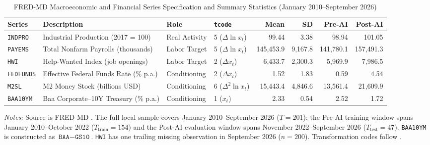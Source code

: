 \begin{table}[htbp]
\centering
\begin{threeparttable}
\caption{FRED-MD Macroeconomic and Financial Series Specification and Summary Statistics (January 2010--September 2026)}
\label{tab:data_summary}
\small
\begin{tabular}{@{}llllrrrr@{}}
\toprule
Series & Description & Role & \texttt{tcode} & Mean & SD & Pre-AI & Post-AI \\
\midrule
\texttt{INDPRO}   & Industrial Production (2017 = 100)       & Real Activity & 5 ($\Delta \ln x_t$)   & 99.44      & 3.38     & 98.94      & 101.05 \\
\texttt{PAYEMS}   & Total Nonfarm Payrolls (thousands)       & Labor Target  & 5 ($\Delta \ln x_t$)   & 145,453.9  & 9,167.8  & 141,780.1  & 157,491.3 \\
\texttt{HWI}      & Help-Wanted Index (job openings)         & Labor Target  & 2 ($\Delta x_t$)       & 6,433.7    & 2,300.3  & 5,969.9    & 7,986.5 \\
\texttt{FEDFUNDS} & Effective Federal Funds Rate (\% p.a.)   & Conditioning  & 2 ($\Delta x_t$)       & 1.52       & 1.83     & 0.59       & 4.54 \\
\texttt{M2SL}     & M2 Money Stock (billions USD)            & Conditioning  & 6 ($\Delta^2 \ln x_t$) & 15,443.4   & 4,846.6  & 13,561.4   & 21,609.9 \\
\texttt{BAA10YM}  & Baa Corporate--10Y Treasury (\% p.a.)    & Conditioning  & 1 ($x_t$)              & 2.33       & 0.54     & 2.52       & 1.72 \\
\bottomrule
\end{tabular}
\begin{tablenotes}[flushleft]
\footnotesize
\item \textit{Notes:} Source is FRED-MD \citep{mccracken2016fredmd}. The full local sample covers January 2010--September 2026 ($T = 201$); the Pre-AI training window spans January 2010--October 2022 ($T_{\text{train}} = 154$) and the Post-AI evaluation window spans November 2022--September 2026 ($T_{\text{test}} = 47$). \texttt{BAA10YM} is constructed as $\texttt{BAA} - \texttt{GS10}$. \texttt{HWI} has one trailing missing observation in September 2026 ($n = 200$). Transformation codes follow \citet{mccracken2016fredmd}.
\end{tablenotes}
\end{threeparttable}
\end{table}
